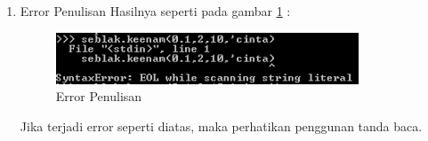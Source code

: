 \begin{enumerate}
\item Error Penulisan
Hasilnya seperti pada gambar \ref{fig:errorpn} :
\begin{figure}[!htbp]
	\centerline{\includegraphics[width=0.85\textwidth]{figures/4/errorpn.PNG}}
	\caption{Error Penulisan}
	\label{fig:errorpn}
\end{figure}
Jika terjadi error seperti diatas, maka perhatikan penggunan tanda baca.
\end{enumerate}